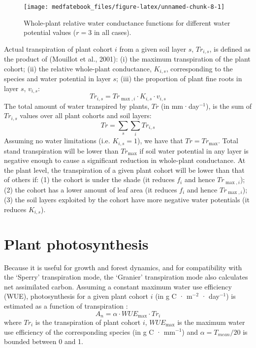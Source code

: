 \documentclass[]{book}
\begin{document}
\begin{figure}

{\centering \texttt{[image: medfatebook\_files/figure-latex/unnamed-chunk-8-1]} 

}

\caption{Whole-plant relative water conductance functions for different water potential values ($r = 3$ in all cases).}\label{fig:unnamed-chunk-8}
\end{figure}

Actual transpiration of plant cohort \(i\) from a given soil layer \(s\), \(Tr_{i,s}\),
is defined as the product of (Mouillot et al., 2001): (i) the maximum transpiration
of the plant cohort; (ii) the relative whole-plant conductance, \(K_{i,s}\),
corresponding to the species and water potential in layer \(s\); (iii) the
proportion of plant fine roots in layer \(s\), \(v_{i,s}\):
\begin{equation}
Tr_{i,s} =  Tr_{\max,i} \cdot K_{i,s} \cdot v_{i,s}
\end{equation}
The total amount of water transpired by plants, \(Tr\) (in mm·day\(^{-1}\)), is the sum of
\(Tr_{i,s}\) values over all plant cohorts and soil layers:
\begin{equation}
Tr =\sum_{s}\sum_{i}{Tr_{i,s}}
\end{equation}
Assuming no water limitations (i.e. \(K_{i,s} = 1\)), we have that \(Tr = Tr_{\max}\).
Total stand transpiration will be lower than \(Tr_{\max}\) if soil water potential
in any layer is negative enough to cause a significant reduction in whole-plant
conductance. At the plant level, the transpiration of a given plant cohort will
be lower than that of others if: (1) the cohort is under the shade (it reduces
\(f_i\) and hence \(Tr_{\max,i}\)); (2) the cohort has a lower amount of leaf area
(it reduces \(f_i\) and hence \(Tr_{\max,i}\)); (3) the soil layers exploited by the
cohort have more negative water potentials (it reduces \(K_{i,s}\)).

\hypertarget{plant-photosynthesis}{%
\section{Plant photosynthesis}\label{plant-photosynthesis}}

Because it is useful for growth and forest dynamics, and for compatibility with
the `Sperry' transpiration mode, the `Granier' transpiration mode also calculates
net assimilated carbon. Assuming a constant maximum water use efficiency (WUE),
photosynthesis for a given plant cohort \(i\) (in g C · m\(^{-2}\) · day\(^{-1}\)) is
estimated as a function of transpiration \citep{Mouillot2001}:
\begin{equation}
A_n = \alpha \cdot WUE_{\max} \cdot Tr_i
\end{equation}
where \(Tr_i\) is the transpiration of plant cohort \(i\), \(WUE_{\max}\) is the
maximum water use efficiency of the corresponding species (in g C · mm\(^{-1}\))
and \(\alpha = T_{mean}/20\) is bounded between 0 and 1.
\end{document}
